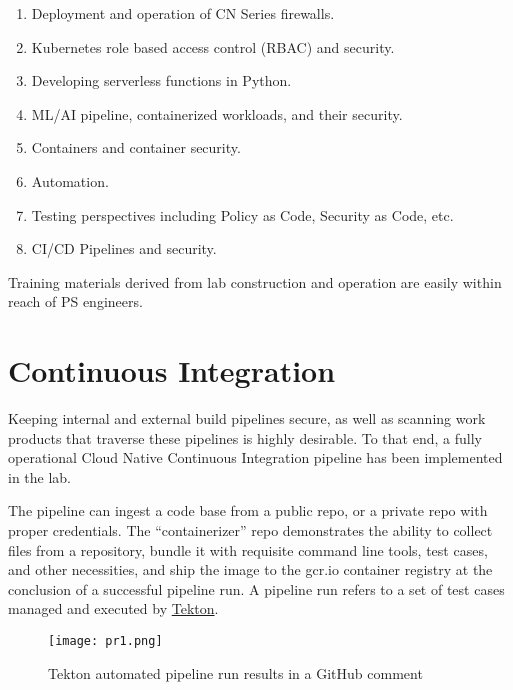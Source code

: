 \begin{raggedright}
	\begin{enumerate}
		\item Deployment and operation of CN Series firewalls.
		\item Kubernetes role based access control (RBAC) and security.
		\item Developing serverless functions in Python.
		\item ML/AI pipeline, containerized workloads, and their security.
		\item Containers and container security.
		\item Automation.
		\item Testing perspectives including Policy as Code, Security as Code, etc.
		\item CI/CD Pipelines and security.
	\end{enumerate}
\end{raggedright}
\vspace{2mm}

Training materials derived from lab construction and operation are easily within reach of PS engineers. 


\section{\label{sec:CI}Continuous Integration}


Keeping internal and external build pipelines secure, as well as scanning work products that traverse these pipelines is highly desirable. To that end, a
fully operational Cloud Native Continuous Integration pipeline has been implemented in the lab.

The pipeline can ingest a code base from a public repo, or a private repo with proper credentials. The ``containerizer'' repo demonstrates the ability
to collect files from a repository, bundle it with requisite command line tools, test cases, and other necessities, and ship the image to the gcr.io container
registry at the conclusion of a successful pipeline run. A pipeline run refers to a set of test cases managed and executed by \href{https://tekton.dev/}{Tekton}.


\begin{figure}[H]
	\texttt{[image: pr1.png]}
	\caption{Tekton automated pipeline run results in a GitHub comment}
	\label{pr}
\end{figure}


